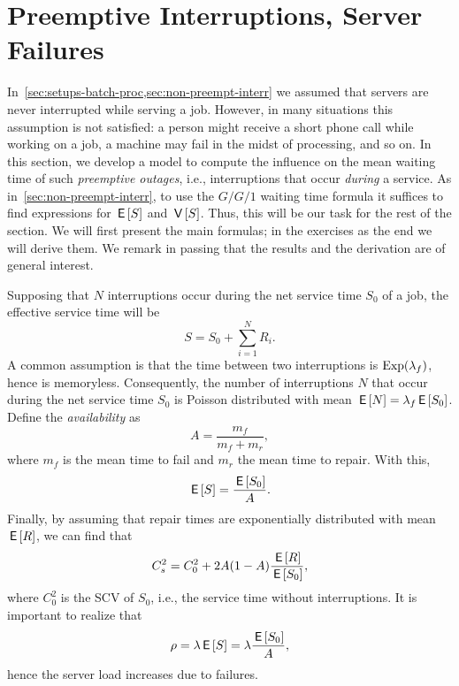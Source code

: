 \section{Preemptive Interruptions, Server Failures}
\label{sec:preempt-interr-serv}




In~\cref{sec:setups-batch-proc,sec:non-preempt-interr} we assumed that servers are never interrupted while serving a job.
However, in many situations this assumption is not satisfied: a person might receive a short phone call while working on a job, a machine may fail in the midst of processing, and so on.
In this section, we develop a model to compute the influence on the mean waiting time of such \emph{preemptive outages}, i.e., interruptions that occur \emph{during} a service.
As in~\cref{sec:non-preempt-interr}, to use the $G/G/1$ waiting time formula it suffices to find expressions for $\,\mathsf{E}\left[S\right]$ and $\,\mathsf{V}\left[S\right]$.
Thus, this will be our task for the rest of the section.
We will first present the main formulas; in the exercises as the end we will derive them.
We remark in passing that the results and the derivation are of general interest.

Supposing that $N$ interruptions occur during the net service time $S_0$ of a job, the effective service time will be
\begin{equation*}
S= S_0 + \sum_{i=1}^N R_i.
\end{equation*}
A common assumption is that the time between two interruptions is $\operatorname{Exp}(\lambda_f)$, hence is memoryless.
Consequently, the number of interruptions $N$ that occur during the net service time $S_0$ is Poisson distributed with mean $\,\mathsf{E}\left[N\right] = \lambda_f \,\mathsf{E}\left[S_0\right]$.
Define the \emph{availability} as
\begin{equation*}
 A=\frac{m_f}{m_f + m_r},
\end{equation*}
where $m_f$ is the mean time to fail and $m_r$ the mean time to repair. 
With this,
\begin{equation}\label{eq:83}
 \,\mathsf{E}\left[S\right] = \frac{\,\mathsf{E}\left[S_0\right]}{A}. 
\end{equation}
Finally, by assuming that repair times are exponentially distributed with mean $\,\mathsf{E}\left[R\right]$, we can find that 
\begin{equation}\label{eq:87}
 C_s^2 = C_0^2 + 2 A(1-A) \frac{\,\mathsf{E}\left[R\right]}{\,\mathsf{E}\left[S_0\right]},
\end{equation}
where $C_0^2$ is the SCV of $S_0$, i.e., the service time without interruptions. 
It is important to realize that 
\begin{equation*}
\rho = \lambda \,\mathsf{E}\left[S\right] = \lambda \frac{\,\mathsf{E}\left[S_0\right]}A,
\end{equation*}
hence the server load increases due to failures. 

